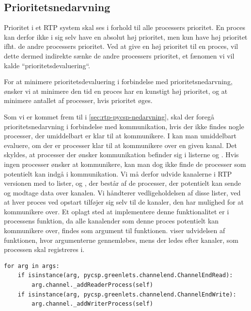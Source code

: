 

\subsection{Prioritetsnedarvning}
\label{sec:deadline-implementation-priorityinheritance}
Prioritet i et RTP system skal ses i forhold til alle processers prioritet. En proces kan derfor ikke i sig selv have en absolut høj prioritet, men kun have høj prioritet ifht. de andre processers prioritet. Ved at give en høj prioritet til  en proces, vil dette dermed  indirekte sænke de andre processers prioritet, et fænomen vi vil kalde ``prioritetsdevaluering``.

For at minimere prioritetsdevaluering i forbindelse med prioritetsnedarvning, ønsker vi at minimere den tid en proces har en kunstigt høj prioritet, og at minimere antallet af processer, hvis prioritet øges. 

Som vi er kommet frem til i \cref{sec:rtp-pycsp-nedarvning}, skal  der foregå  prioritetsnedarvning i forbindelse med kommunikation, hvis der ikke findes nogle processer, der umiddelbart er klar til at kommunikere.  I \pycsp kan man umiddelbart evaluere, om der er processer klar til at kommunikere over en given kanal. Det skyldes, at processer der ønsker kommunikation befinder sig i listerne  og . Hvis ingen processer ønsker at kommunikere, kan man dog ikke finde de processer som potentielt kan indgå i kommunikation.
Vi må derfor udvide kanalerne i RTP versionen med to lister,  og , der består af de processer, der potentielt kan sende og modtage data over kanalen. Vi håndterer vedligeholdelsen af disse lister, ved at hver proces ved opstart tilføjer sig selv til de kanaler, den har mulighed for at kommunikere over. Et oplagt sted at implementere denne funktionalitet er i processens    funktion, da alle kanalender som denne proces potentielt kan kommunikere over, findes som argument til   funktionen.  viser udvidelsen af funktionen, hvor argumenterne gennemløbes, mens der ledes efter kanaler, som processen skal registreres i.

\begin{lstlisting}[firstnumber=29 ,float=hbtp, label=lst:process-init, caption=Uddrag af \code{Process}' \code{\_\_init\_\_}funktion]
for arg in args:
    if isinstance(arg, pycsp.greenlets.channelend.ChannelEndRead):
        arg.channel._addReaderProcess(self)
    if isinstance(arg, pycsp.greenlets.channelend.ChannelEndWrite):
        arg.channel._addWriterProcess(self)  
\end{lstlisting}

